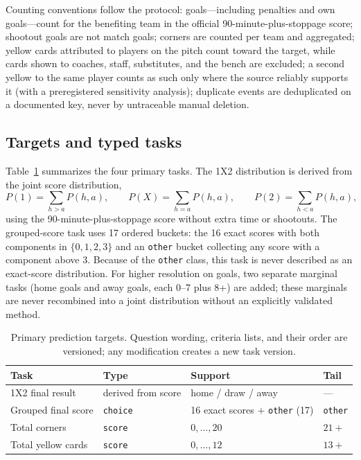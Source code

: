 \documentclass[11pt]{article}
\begin{document}
Counting conventions follow the protocol: goals---including penalties and own
goals---count for the benefiting team in the official 90-minute-plus-stoppage
score; shootout goals are not match goals; corners are counted per team and
aggregated; yellow cards attributed to players on the pitch count toward the
target, while cards shown to coaches, staff, substitutes, and the bench are
excluded; a second yellow to the same player counts as such only where the
source reliably supports it (with a preregistered sensitivity analysis);
duplicate events are deduplicated on a documented key, never by untraceable
manual deletion.

\subsection{Targets and typed tasks}
\label{sec:targets}

Table~\ref{tab:targets} summarizes the four primary tasks. The 1X2
distribution is derived from the joint score distribution,
\begin{equation}
P(1)=\sum_{h>a}P(h,a),\qquad
P(X)=\sum_{h=a}P(h,a),\qquad
P(2)=\sum_{h<a}P(h,a),
\end{equation}
using the 90-minute-plus-stoppage score without extra time or shootouts. The
grouped-score task uses 17 ordered buckets: the 16 exact scores with both
components in $\{0,1,2,3\}$ and an \texttt{other} bucket collecting any score
with a component above 3. Because of the \texttt{other} class, this task is
never described as an exact-score distribution. For higher resolution on
goals, two separate marginal tasks (home goals and away goals, each 0--7 plus
8+) are added; these marginals are never recombined into a joint distribution
without an explicitly validated method.

\begin{table}[t]
\centering
\small
\begin{tabular}{@{}llll@{}}
\toprule
\textbf{Task} & \textbf{Type} & \textbf{Support} & \textbf{Tail} \\
\midrule
1X2 final result      & derived from score & home / draw / away & --- \\
Grouped final score   & \texttt{choice}   & 16 exact scores $+$ \texttt{other} (17) & \texttt{other} \\
Total corners         & \texttt{score}    & $0,\dots,20$ & $21+$ \\
Total yellow cards    & \texttt{score}    & $0,\dots,12$ & $13+$ \\
\bottomrule
\end{tabular}
\caption{Primary prediction targets. Question wording, criteria lists, and
their order are versioned; any modification creates a new task version.}
\label{tab:targets}
\end{table}
\end{document}
